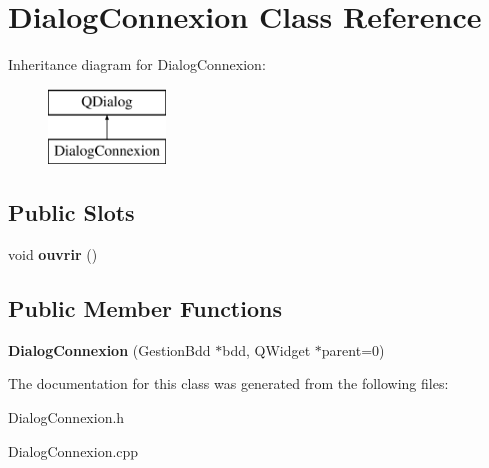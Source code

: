 \section{Dialog\-Connexion Class Reference}
\label{class_dialog_connexion}
Inheritance diagram for Dialog\-Connexion\-:\begin{figure}[H]
\begin{center}
\leavevmode
\includegraphics[height=2.000000cm]{class_dialog_connexion}
\end{center}
\end{figure}
\subsection*{Public Slots}
\begin{DoxyCompactItemize}
\item 
void {\bfseries ouvrir} ()\label{class_dialog_connexion_aef2d318cc32047ad6c5f7048cc8fb312}

\end{DoxyCompactItemize}
\subsection*{Public Member Functions}
\begin{DoxyCompactItemize}
\item 
{\bfseries Dialog\-Connexion} (Gestion\-Bdd $\ast$bdd, Q\-Widget $\ast$parent=0)\label{class_dialog_connexion_ab104195df6defa3939318919ec495d52}

\end{DoxyCompactItemize}


The documentation for this class was generated from the following files\-:\begin{DoxyCompactItemize}
\item 
Dialog\-Connexion.\-h\item 
Dialog\-Connexion.\-cpp\end{DoxyCompactItemize}
